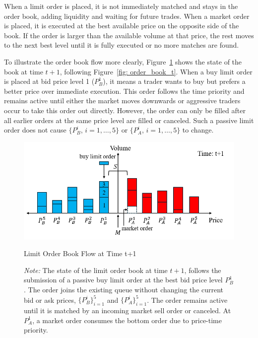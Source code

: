 When a limit order is placed, it is not immediately matched and stays in the order book, adding liquidity and waiting for future trades. When a market order is placed, it is executed at the best available price on the opposite side of the book. If the order is larger than the available volume at that price, the rest moves to the next best level until it is fully executed or no more matches are found. 

To illustrate the order book flow more clearly, Figure~\ref{fig: order_book_t_1} shows the state of the book at time $t+1$, following Figure~\ref{fig: order_book_t}. When a buy limit order is placed at bid price level 1 ($P_B^1$), it means a trader wants to buy but prefers a better price over immediate execution. This order follows the time priority and remains active until either the market moves downwards or aggressive traders occur to take this order out directly. However, the order can only be filled after all earlier orders at the same price level are filled or canceled. Such a passive limit order does not cause $\{P_B ^ {i}$, $i = 1, \dots, 5\}$ or $\{P_A ^ {i}$, $i = 1, \dots, 5\}$ to change. 

\begin{figure}[htbp]
    \centering
    \includegraphics[width=0.8\linewidth]{figures/order_book_t_1.png}
    \caption{Limit Order Book Flow at Time t+1}
    \caption*{\textit{Note:} The state of the limit order book at time $t+1$, follows the submission of a passive buy limit order at the best bid price level $P_B^1$. The order joins the existing queue without changing the current bid or ask prices, $\{P_B^i\}_{i=1}^5$ and $\{P_A^i\}_{i=1}^5$. The order remains active until it is matched by an incoming market sell order or canceled. At $P_A^1$, a market order consumes the bottom order due to price-time priority.}
    \label{fig: order_book_t_1}
\end{figure}


